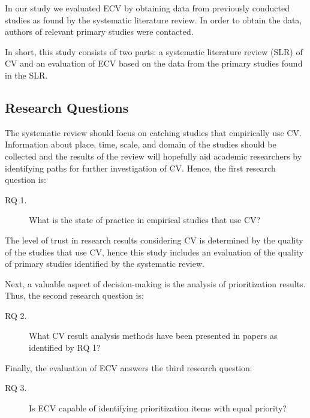 In our study we evaluated ECV by obtaining data from previously conducted studies as found by the systematic literature review. In order to obtain the data, authors of relevant primary studies were contacted.

In short, this study consists of two parts: a systematic literature review (SLR) of CV and an evaluation of ECV based on the data from the primary studies found in the SLR.

\subsection{Research Questions}

The systematic review should focus on catching studies that empirically use CV. Information about place, time, scale, and domain of the studies should be collected and the results of the review will hopefully aid academic researchers by identifying paths for further investigation of CV. Hence, the first research question is:

\begin{description}
\item[RQ 1.] What is the state of practice in empirical studies that use CV?
\end{description}

The level of trust in research results considering CV is determined by the quality of the studies that use CV, hence this study includes an evaluation of the quality of primary studies identified by the systematic review.

Next, a valuable aspect of decision-making is the analysis of prioritization results.
Thus, the second research question is:

\begin{description}
\item[RQ 2.] What CV result analysis methods have been presented in papers as identified by RQ 1?
\end{description}

Finally, the evaluation of ECV answers the third research question:

\begin{description}
\item[RQ 3.] Is ECV capable of identifying prioritization items with equal priority?
\end{description}